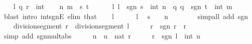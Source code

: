 \begin{isabellebody}
\isamarkupfalse%
\isanewline
\ \ \isamarkupfalse%
\ l\ q\ r\ {\isacharcolon}{\kern0pt}{\isacharcolon}{\kern0pt}\ int\isanewline
\ \ \isamarkupfalse%
\ n\ m\ \ s\ t\isanewline
\ \ \ \ \ \ l{\isacharcolon}{\kern0pt}\ {\isachardoublequoteopen}l\ {\isacharequal}{\kern0pt}\ sgn\ s\ {\isacharasterisk}{\kern0pt}\ int\ n{\isachardoublequoteclose}\ \ q{\isacharcolon}{\kern0pt}\ {\isachardoublequoteopen}q\ {\isacharequal}{\kern0pt}\ sgn\ t\ {\isacharasterisk}{\kern0pt}\ int\ m{\isachardoublequoteclose}\isanewline
\ \ \ \ \isamarkupfalse%
\ {\isacharparenleft}{\kern0pt}blast\ intro{\isacharcolon}{\kern0pt}\ int{\isacharunderscore}{\kern0pt}sgnE\ elim{\isacharcolon}{\kern0pt}\ that{\isacharparenright}{\kern0pt}\isanewline
\ \ \isamarkupfalse%
\ {\isacartoucheopen}l\ {\isasymnoteq}\ {}{\isacartoucheclose}\isanewline
\ \ \isamarkupfalse%
\ l\ \isamarkupfalse%
\ {\isachardoublequoteopen}s\ {\isasymnoteq}\ {}{\isachardoublequoteclose}\ \ {\isachardoublequoteopen}n\ {\isachargreater}{\kern0pt}\ {}{\isachardoublequoteclose}\isanewline
\ \ \ \ \isamarkupfalse%
\ {\isacharparenleft}{\kern0pt}simp{\isacharunderscore}{\kern0pt}all\ add{\isacharcolon}{\kern0pt}\ sgn{\isacharunderscore}{\kern0pt}{}{\isacharunderscore}{\kern0pt}{}{\isacharparenright}{\kern0pt}\isanewline
\ \ \isamarkupfalse%
\ {\isachardoublequoteopen}division{\isacharunderscore}{\kern0pt}segment\ r\ {\isacharequal}{\kern0pt}\ division{\isacharunderscore}{\kern0pt}segment\ l{\isachardoublequoteclose}\isanewline
\ \ \isamarkupfalse%
\ \isamarkupfalse%
\ {\isachardoublequoteopen}r\ {\isacharequal}{\kern0pt}\ sgn\ r\ {\isacharasterisk}{\kern0pt}\ {\isasymbar}r{\isasymbar}{\isachardoublequoteclose}\isanewline
\ \ \ \ \isamarkupfalse%
\ {\isacharparenleft}{\kern0pt}simp\ add{\isacharcolon}{\kern0pt}\ sgn{\isacharunderscore}{\kern0pt}mult{\isacharunderscore}{\kern0pt}abs{\isacharparenright}{\kern0pt}\isanewline
\ \ \isamarkupfalse%
\ \isamarkupfalse%
\ u\ \ {\isachardoublequoteopen}u\ {\isacharequal}{\kern0pt}\ nat\ {\isasymbar}r{\isasymbar}{\isachardoublequoteclose}\isanewline
\ \ \isamarkupfalse%
\ \isamarkupfalse%
\ {\isachardoublequoteopen}r\ {\isacharequal}{\kern0pt}\ sgn\ l\ {\isacharasterisk}{\kern0pt}\ int\ u{\isachardoublequoteclose}\isanewline

\end{isabellebody}
